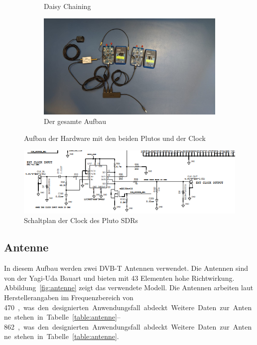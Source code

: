 \begin{figure}
\begin{subfigure}[Daisy Chaining]{0.3\textwidth}
        \caption{Daisy Chaining\\}
    \end{subfigure}
    \begin{subfigure}[Gesamter Aufbau]{0.3\textwidth}
        \includegraphics[width=\textwidth]{images/Pluto_4.jpeg}
        \caption{Der gesamte Aufbau\\}
    \end{subfigure}
    \caption{Aufbau der Hardware mit den beiden Plutos und der Clock} \label{fig:Pluto}
\end{figure}

\begin{figure}
    \centering
    \includegraphics[width=\textwidth]{images/Schaltplan_Clock.png}
    \caption{Schaltplan der Clock des Pluto SDRs} \label{fig:Clock}
\end{figure}

\subsection{Antenne}
In diesem Aufbau werden zwei DVB-T Antennen verwendet. Die Antennen sind von der Yagi-Uda Bauart und bieten mit 43 Elementen hohe Richtwirkung. Abbildung~\ref{fig:antenne} zeigt das verwendete Modell. Die Antennen arbeiten laut Herstellerangaben im Frequenzbereich von \SIrange{470}{862}, was den designierten Anwendungsfall abdeckt. Weitere Daten zur Antenne stehen in Tabelle~\ref{table:antenne}.

